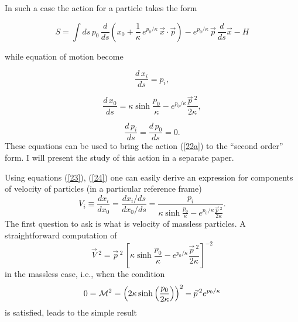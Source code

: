 \documentclass[a4paper,a4paper]{article}
\begin{document}
In such  a case the action for a particle takes the form

\begin{equation}\label{22a}
  S = \int ds \, p_0 \, \frac{d}{ds} \left( x_0 + \frac1\kappa\, e^{p_0/\kappa}\, \vec{x}\cdot \vec{p} \right) - e^{p_0/\kappa}\, \vec{p} \, \frac{d}{ds} \vec{x} - H
\end{equation}

while equation of motion become

\begin{equation}\label{23}
  \frac{d\, x_i}{ds} = p_i,
\end{equation}

\begin{equation}\label{24}
 \frac{d\, x_0}{ds} = \kappa \sinh \frac{p_0}\kappa - e^{p_0/\kappa} \frac{\vec{p}\,{}^2}{2\kappa},
\end{equation}

\begin{equation}\label{25}
  \frac{d\, p_i}{ds} =\frac{d\, p_0}{ds} =0.
\end{equation}
These equations can be used to bring the action (\ref{22a}) to the ``second order'' form. I will present the study of this action in a separate paper.

Using  equations (\ref{23}), (\ref{24}) one can easily derive an expression for components of velocity of particles (in a particular reference frame)
\begin{equation}\label{26}
 V_i \equiv \frac{dx_i}{dx_0} =  \frac{dx_i/ds}{dx_0/ds} = \frac{p_i}{\kappa \sinh \frac{p_0}\kappa - e^{p_0/\kappa} \frac{\vec{p}\,{}^2}{2\kappa}}.
\end{equation}
 The first question to ask is what is velocity of massless particles. A straightforward computation of $$\vec{V}\,{}^2 = \vec{p}\,{}^2\,\left[\kappa \sinh \frac{p_0}\kappa - e^{p_0/\kappa} \frac{\vec{p}\,{}^2}{2\kappa}\right]^{-2}$$ in the massless case, i.e., when the condition $$0={\cal M}^2 = \left(2\kappa \sinh\left(\frac{p_0}{2\kappa}\right)\right)^2 - \vec{p}\,{}^2 e^{p_0/\kappa}$$ is satisfied, leads to the simple result
\end{document}
